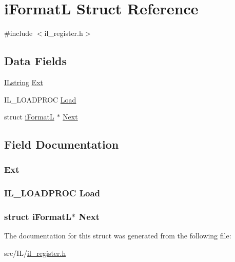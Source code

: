 \hypertarget{structi_format_l}{\section{i\-Format\-L Struct Reference}
\label{structi_format_l}
}


{\ttfamily \#include $<$il\-\_\-register.\-h$>$}

\subsection*{Data Fields}
\begin{DoxyCompactItemize}
\item 
\hyperlink{il_8h_a0e32959a190ae33935a98df16a7fdb5a}{I\-Lstring} \hyperlink{structi_format_l_a1b92ae18786b99897e88ed17afe1df37}{Ext}
\item 
I\-L\-\_\-\-L\-O\-A\-D\-P\-R\-O\-C \hyperlink{structi_format_l_a200f08659880417df3e45165df2e728f}{Load}
\item 
struct \hyperlink{structi_format_l}{i\-Format\-L} $\ast$ \hyperlink{structi_format_l_a8c953650d3e7ff1d5f618c292a3e604e}{Next}
\end{DoxyCompactItemize}


\subsection{Field Documentation}
\hypertarget{structi_format_l_a1b92ae18786b99897e88ed17afe1df37}{
\subsubsection[{Ext}]{ Ext}}\label{structi_format_l_a1b92ae18786b99897e88ed17afe1df37}
\hypertarget{structi_format_l_a200f08659880417df3e45165df2e728f}{
\subsubsection[{Load}]{\setlength{\rightskip}{0pt plus 5cm}I\-L\-\_\-\-L\-O\-A\-D\-P\-R\-O\-C Load}}\label{structi_format_l_a200f08659880417df3e45165df2e728f}
\hypertarget{structi_format_l_a8c953650d3e7ff1d5f618c292a3e604e}{
\subsubsection[{Next}]{\setlength{\rightskip}{0pt plus 5cm}struct {\bf i\-Format\-L}$\ast$ Next}}\label{structi_format_l_a8c953650d3e7ff1d5f618c292a3e604e}


The documentation for this struct was generated from the following file\-:\begin{DoxyCompactItemize}
\item 
src/\-I\-L/\hyperlink{il__register_8h}{il\-\_\-register.\-h}\end{DoxyCompactItemize}
